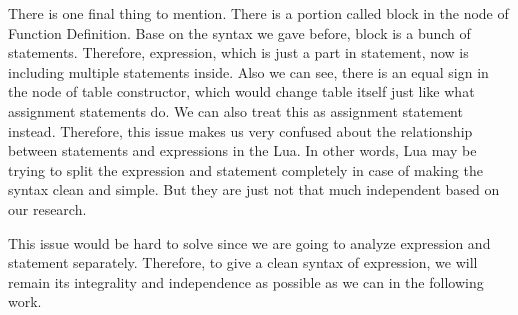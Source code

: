\documentclass{article}
\begin{document}
There is one final thing to mention. There is a portion called block in the node of Function Definition. Base on the syntax we gave before, block is a bunch of statements. Therefore, expression, which is just a part in statement, now is including multiple statements inside. Also we can see, there is an equal sign in the node of table constructor, which would change table itself just like what assignment statements do. We can also treat this as assignment statement instead. Therefore, this issue makes us very confused about the relationship between statements and expressions in the Lua. In other words, Lua may be trying to split the expression and statement completely in case of making the syntax clean and simple. But they are just not that much independent based on our research.

This issue would be hard to solve since we are going to analyze expression and statement separately. Therefore, to give a clean syntax of expression, we will remain its integrality and independence as possible as we can in the following work.



\newcommand{\mydefhead}[2]{\multicolumn{2}{l}{{#1}}&\mbox{\emph{#2}}\\}
\newcommand{\mydefcase}[2]{\qquad\qquad& #1 &\mbox{#2}\\}

\newcommand{\functiondef}[2]{\mbox{\tt function}~(\overline{#1_i})~#2~ {\tt end}}
\end{document}
